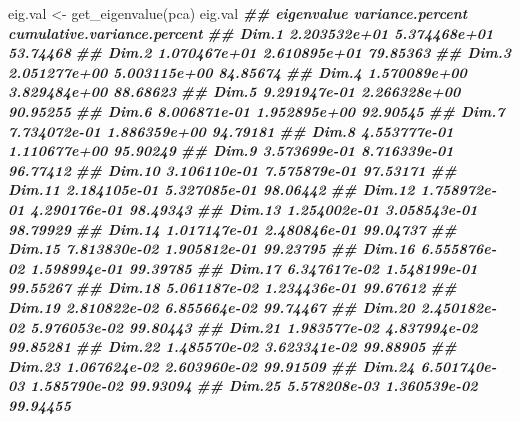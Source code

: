 \documentclass[
]{article}
\newenvironment{Shaded}{\begin{snugshade}}{\end{snugshade}}
\newcommand{\DocumentationTok}[1]{\textcolor[rgb]{0.56,0.35,0.01}{\textbf{\textit{#1}}}}
\newcommand{\FunctionTok}[1]{\textcolor[rgb]{0.00,0.00,0.00}{#1}}
\newcommand{\NormalTok}[1]{#1}
\newcommand{\OtherTok}[1]{\textcolor[rgb]{0.56,0.35,0.01}{#1}}
\begin{document}
\begin{Shaded}
\begin{Highlighting}[]

\NormalTok{eig.val }\OtherTok{\textless{}{-}} \FunctionTok{get\_eigenvalue}\NormalTok{(pca)}
\NormalTok{eig.val}
\DocumentationTok{\#\#          eigenvalue variance.percent cumulative.variance.percent}
\DocumentationTok{\#\# Dim.1  2.203532e+01     5.374468e+01                    53.74468}
\DocumentationTok{\#\# Dim.2  1.070467e+01     2.610895e+01                    79.85363}
\DocumentationTok{\#\# Dim.3  2.051277e+00     5.003115e+00                    84.85674}
\DocumentationTok{\#\# Dim.4  1.570089e+00     3.829484e+00                    88.68623}
\DocumentationTok{\#\# Dim.5  9.291947e{-}01     2.266328e+00                    90.95255}
\DocumentationTok{\#\# Dim.6  8.006871e{-}01     1.952895e+00                    92.90545}
\DocumentationTok{\#\# Dim.7  7.734072e{-}01     1.886359e+00                    94.79181}
\DocumentationTok{\#\# Dim.8  4.553777e{-}01     1.110677e+00                    95.90249}
\DocumentationTok{\#\# Dim.9  3.573699e{-}01     8.716339e{-}01                    96.77412}
\DocumentationTok{\#\# Dim.10 3.106110e{-}01     7.575879e{-}01                    97.53171}
\DocumentationTok{\#\# Dim.11 2.184105e{-}01     5.327085e{-}01                    98.06442}
\DocumentationTok{\#\# Dim.12 1.758972e{-}01     4.290176e{-}01                    98.49343}
\DocumentationTok{\#\# Dim.13 1.254002e{-}01     3.058543e{-}01                    98.79929}
\DocumentationTok{\#\# Dim.14 1.017147e{-}01     2.480846e{-}01                    99.04737}
\DocumentationTok{\#\# Dim.15 7.813830e{-}02     1.905812e{-}01                    99.23795}
\DocumentationTok{\#\# Dim.16 6.555876e{-}02     1.598994e{-}01                    99.39785}
\DocumentationTok{\#\# Dim.17 6.347617e{-}02     1.548199e{-}01                    99.55267}
\DocumentationTok{\#\# Dim.18 5.061187e{-}02     1.234436e{-}01                    99.67612}
\DocumentationTok{\#\# Dim.19 2.810822e{-}02     6.855664e{-}02                    99.74467}
\DocumentationTok{\#\# Dim.20 2.450182e{-}02     5.976053e{-}02                    99.80443}
\DocumentationTok{\#\# Dim.21 1.983577e{-}02     4.837994e{-}02                    99.85281}
\DocumentationTok{\#\# Dim.22 1.485570e{-}02     3.623341e{-}02                    99.88905}
\DocumentationTok{\#\# Dim.23 1.067624e{-}02     2.603960e{-}02                    99.91509}
\DocumentationTok{\#\# Dim.24 6.501740e{-}03     1.585790e{-}02                    99.93094}
\DocumentationTok{\#\# Dim.25 5.578208e{-}03     1.360539e{-}02                    99.94455}

\end{Highlighting}
\end{Shaded}
\end{document}
